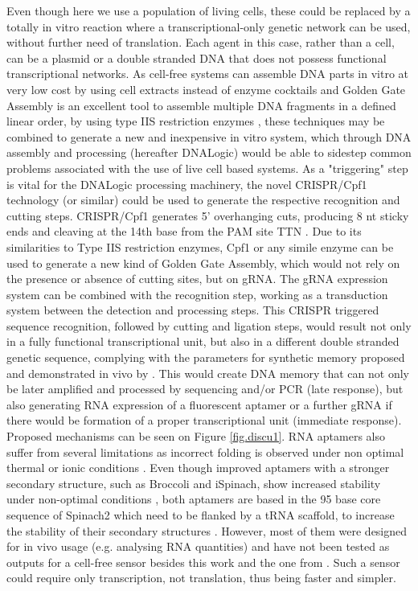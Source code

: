 Even though here we use a population of living cells, these could be replaced by a totally in vitro reaction where a transcriptional-only genetic network can be used, without further need of translation. Each agent in this case, rather than a cell, can be a plasmid or a double stranded DNA that does not possess functional transcriptional networks. As cell-free systems can assemble DNA parts in vitro at very low cost by using cell extracts instead of enzyme cocktails \citep{casini2014one} and Golden Gate Assembly is an excellent tool to assemble multiple DNA fragments in a defined linear order, by using type IIS restriction enzymes \citep{engler2008one} , these techniques may be combined to generate a new and inexpensive in vitro system, which through DNA assembly and processing (hereafter DNALogic) would be able to sidestep common problems associated with the use of live cell based systems. As a "triggering" step is vital for the DNALogic processing machinery, the novel CRISPR/Cpf1 technology (or similar) could be used to generate the respective recognition and cutting steps. CRISPR/Cpf1 generates 5' overhanging cuts, producing 8 nt sticky ends and cleaving at the 14th base from the PAM site TTN \citep{Lei2017a, li2016c}. Due to its similarities to Type IIS restriction enzymes, Cpf1 or any simile enzyme can be used to generate a new kind of Golden Gate Assembly, which would not rely on the presence or absence of cutting sites, but on gRNA. The gRNA expression system can be combined with the recognition step, working as a transduction system between the detection and processing steps. This CRISPR triggered sequence recognition, followed by cutting and ligation steps, would result not only in a fully functional transcriptional unit, but also in a different double stranded genetic sequence, complying with the parameters for synthetic memory proposed and demonstrated in vivo by \citet{siuti2013synthetic}. This would create DNA memory that can not only be later amplified and processed by sequencing and/or PCR (late response), but also generating RNA expression of a fluorescent aptamer or a further gRNA if there would be formation of a proper transcriptional unit (immediate response). Proposed mechanisms can be seen on Figure \ref{fig.discu1}. 
RNA aptamers also suffer from several limitations as incorrect folding is observed under non optimal thermal or ionic conditions \citep{autour2016ispinach}. Even though improved aptamers with a stronger secondary structure, such as Broccoli and iSpinach, show increased stability under non-optimal conditions \citep{filonov2014broccoli, autour2016ispinach}, both aptamers are based in the 95 base core sequence of Spinach2 which need to be flanked by a tRNA scaffold, to increase the stability of their secondary structures \citep{filonov2014broccoli, autour2016ispinach, strack2013superfolding}. However, most of them were designed for in vivo usage (e.g. analysing RNA quantities) and have not been tested as outputs for a cell-free sensor besides this work and the one from \citet{jung2020cell}. Such a sensor could require only transcription, not translation, thus being faster and simpler.

